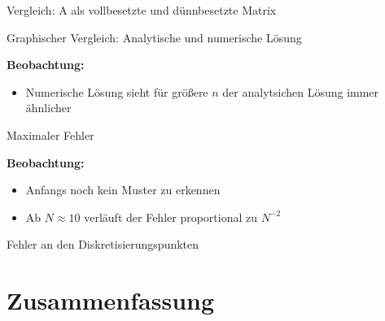 \documentclass[9pt, t]{beamer}
\begin{document}
\begin{frame}{Vergleich: A als vollbesetzte und dünnbesetzte Matrix}





\end{frame}



\begin{frame}{Graphischer Vergleich: Analytische und numerische Lösung}





\textbf{Beobachtung:}
\begin{itemize}
    \item Numerische Lösung sieht für größere \(n\) der analytsichen Lösung immer ähnlicher
\end{itemize}
\end{frame}




\begin{frame}{Maximaler Fehler}






\textbf{Beobachtung:}
\begin{itemize}
    \item Anfangs noch kein Muster zu erkennen
    \item Ab \(N \approx 10\) verläuft der Fehler proportional zu \(N^{-2}\)
\end{itemize}
\end{frame}




\begin{frame}{Fehler an den Diskretisierungspunkten}
\end{frame}















\section{Zusammenfassung}
\end{document}
